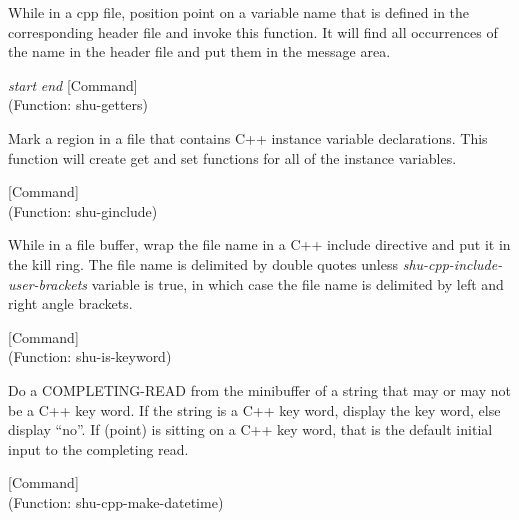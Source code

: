 \begin{doc-string}
While in a cpp file, position point on a variable name that is defined in the
corresponding header file and invoke this function.  It will find all occurrences of
the name in the header file and put them in the message area.
\end{doc-string}

\vspace{1em}
\noindent
{}
\usebox{\funcname}\emph{start} \emph{end}
 \hfill [Command]\\%
 (Function: shu-getters)

\begin{doc-string}
Mark a region in a file that contains C++ instance variable declarations.
This function will create get and set functions for all of the instance
variables.
\end{doc-string}

\vspace{1em}
\noindent
{}
\usebox{\funcname}
 \hfill [Command]\\%
 (Function: shu-ginclude)

\begin{doc-string}
While in a file buffer, wrap the file name in a C++ include directive and
put it in the kill ring.  The file name is delimited by double quotes unless
\emph{shu-cpp-include-user-brackets} variable is true, in which case the file name
is delimited by left and right angle brackets.
\end{doc-string}

\vspace{1em}
\noindent
{}
\usebox{\funcname}
 \hfill [Command]\\%
 (Function: shu-is-keyword)

\begin{doc-string}
Do a COMPLETING-READ from the minibuffer of a string that may or may not be a
C++ key word.  If the string is a C++ key word, display the key word, else
display ``no''.  If (point) is sitting on a C++ key word, that is the default
initial input to the completing read.
\end{doc-string}

\vspace{1em}
\noindent
{}
\usebox{\funcname}
 \hfill [Command]\\%
 (Function: shu-cpp-make-datetime)


